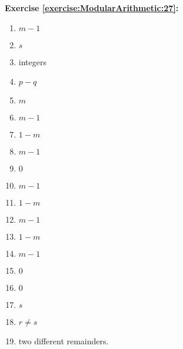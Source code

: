 \noindent\textbf{Exercise \ref{exercise:ModularArithmetic:27}:} %

\begin{multicols}{4}
\begin{enumerate}
\item
\noindent
$m-1$
\item
$s$
\item
integers
\item
$p-q$
\item
$m$
\item
$m-1$
\item
$1-m$
\item
$m-1$
\item
$0$
\item
$m-1$
\item
$1-m$
\item
$m-1$
\item
$1-m$
\item
$m-1$
\item
$0$
\item
$0$
\item
$s$
\item
$r \neq s$
\item
two different remainders.
\end{enumerate}
\end{multicols}

